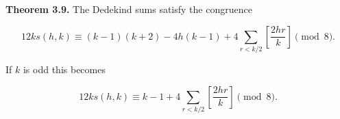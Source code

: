 \textbf{Theorem 3.9.}
The Dedekind sums satisfy the congruence

$$
12ks(h, k) \equiv (k - 1)(k + 2) - 4h(k - 1) + 4 \sum_{r < k/2} \left[ \frac{2hr}{k} \right] \pmod{8}.
$$

If $k$ is odd this becomes

$$
12ks(h, k) \equiv k - 1 + 4 \sum_{r < k/2} \left[ \frac{2hr}{k} \right] \pmod{8}.
$$
